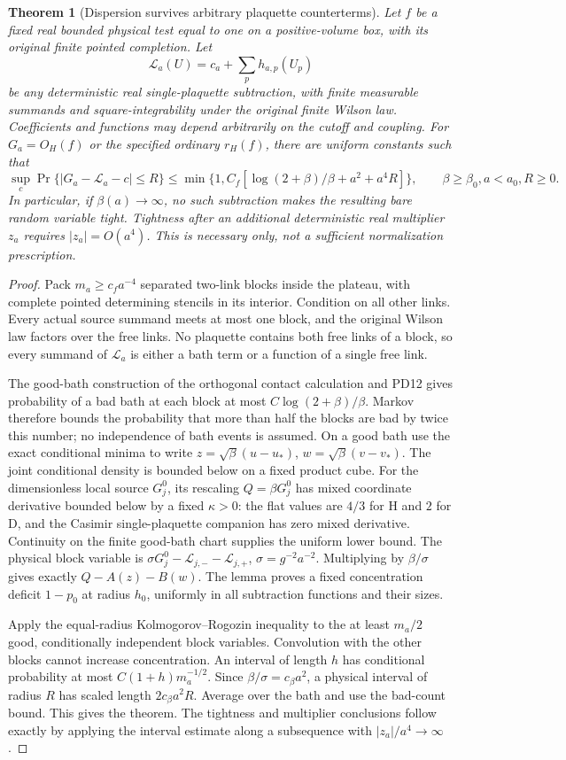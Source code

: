 \documentclass[11pt]{article}
\newtheorem{theorem}{Theorem}
\begin{document}
\begin{theorem}[Dispersion survives arbitrary plaquette counterterms]
Let $f$ be a fixed real bounded physical test equal to one on a positive-volume box, with
its original finite pointed completion. Let
\[
 \mathcal L_a(U)=c_a+\sum_p h_{a,p}(U_p)
\]
be any deterministic real single-plaquette subtraction, with finite measurable summands
and square-integrability under the original finite Wilson law. Coefficients and functions
may depend arbitrarily on the cutoff and coupling. For $G_a=O_H(f)$ or the specified
ordinary $r_H(f)$, there are uniform constants such that
\[
 \sup_c\Pr\{|G_a-\mathcal L_a-c|\le R\}
 \le\min\{1,C_f[\log(2+\beta)/\beta+a^2+a^4R]\},
 \qquad\beta\ge\beta_0, a<a_0, R\ge0.
\]
In particular, if $\beta(a)\to\infty$, no such subtraction makes the resulting bare
random variable tight. Tightness after an additional deterministic real multiplier $z_a$
requires $|z_a|=O(a^4)$. This is necessary only, not a sufficient normalization prescription.
\end{theorem}
\begin{proof}
Pack $m_a\ge c_fa^{-4}$ separated two-link blocks inside the plateau, with complete
pointed determining stencils in its interior. Condition on all other links. Every actual
source summand meets at most one block, and the original Wilson law factors over the
free links. No plaquette contains both free links of a block, so every summand of
$\mathcal L_a$ is either a bath term or a function of a single free link.

The good-bath construction of the orthogonal contact calculation and PD12 gives probability of a bad bath at each
block at most $C\log(2+\beta)/\beta$. Markov therefore bounds the probability that
more than half the blocks are bad by twice this number; no independence of bath events
is assumed. On a good bath use the exact conditional minima to write
$z=\sqrt\beta(u-u_*)$, $w=\sqrt\beta(v-v_*)$. The joint conditional density is bounded
below on a fixed product cube.
For the dimensionless local source $G_j^0$, its rescaling $Q=\beta G_j^0$ has mixed
coordinate derivative bounded below by a fixed $\kappa>0$: the flat values are $4/3$
for H and $2$ for D, and the Casimir single-plaquette companion has zero mixed derivative.
Continuity on the finite good-bath chart supplies the uniform lower bound.
The physical block variable is $\sigma G_j^0-\mathcal L_{j,-}-\mathcal L_{j,+}$,
$\sigma=g^{-2}a^{-2}$. Multiplying by $\beta/\sigma$ gives exactly
$Q-A(z)-B(w)$. The lemma proves a fixed concentration deficit $1-p_0$ at radius $h_0$,
uniformly in all subtraction functions and their sizes.

Apply the equal-radius Kolmogorov--Rogozin inequality to the at least $m_a/2$ good,
conditionally independent block variables. Convolution with the other blocks cannot
increase concentration. An interval of length $h$ has conditional probability at most
$C(1+h)m_a^{-1/2}$. Since $\beta/\sigma=c_\beta a^2$, a physical interval of radius
$R$ has scaled length $2c_\beta a^2R$. Average over the bath and use the bad-count bound.
This gives the theorem. The tightness and multiplier conclusions follow exactly by
applying the interval estimate along a subsequence with $|z_a|/a^4\to\infty$.
\end{proof}
\end{document}
